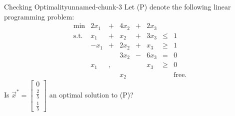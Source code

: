 \begin{example}{Checking Optimality}{unnamed-chunk-3}
\protect\hypertarget{ex:unnamed-chunk-3}{}{\label{ex:unnamed-chunk-3}} Let
(P) denote the following linear programming problem:
\[\begin{array}{rrcrcrlll}
\mbox{min} & 2 x_1 & +& 4x_2  & + & 2x_3  \\
\mbox{s.t.} 
&  x_1 & + &  x_2 & + & 3x_3  & \leq & 1  \\
& -x_1 & + & 2x_2 & + &  x_3  & \geq & 1  \\
&      &   & 3x_2 & - & 6x_3  & = & 0  \\
&  x_1 & , &     &    & x_3  & \geq & 0 \\
&      &   & x_2  &   &      &    & \mbox{free.}
\end{array}\] Is
\(\vec{x}^* =\left[\begin{array}{c} 0\\\frac{2}{5}\\ \frac{1}{5} \end{array}\right]\)
an optimal solution to (P)?
\end{example}

